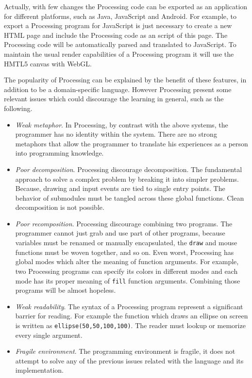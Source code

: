 Actually, with few changes the Processing code can be exported as an application for different platforms, such as Java, JavaScript and Android. For example, to export a Processing program for JavaScript is just necessary to create a new HTML page and include the Processing code as an script of this page. The Processing code will be automatically parsed and translated to JavaScript. To maintain the usual render capabilities of a Processing program it will use the HMTL5 canvas with WebGL.

The popularity of Processing can be explained by the benefit of these features, in addition to be a domain-specific language. However Processing present some relevant issues which could discourage the learning in general, such as the following.

\begin{itemize}
  \item \textit{Weak metaphor}. In Processing, by contrast with the above systems, the programmer has no identity within the system. There are no strong metaphors that allow the programmer to translate his experiences as a person into programming knowledge. 

  \item \textit{Poor decomposition}. Processing discourage decomposition. The fundamental approach to solve a complex problem by breaking it into simpler problems. Because, drawing and input events are tied to single entry points. The behavior of submodules must be tangled across these global functions. Clean decomposition is not possible.

  \item \textit{Poor recomposition}. Processing discourage combining two programs. The programmer cannot just grab and use part of other programs, because variables must be renamed or manually encapsulated, the \texttt{draw} and mouse functions must be woven together, and so on. Even worst, Processing has global modes which alter the meaning of function arguments. For example, two Processing programs can specify its colors in different modes and each mode has its proper meaning of \texttt{fill} function arguments. Combining those programs will be almost hopeless. 

  \item \textit{Weak readability}. The syntax of a Processing program represent a significant barrier for reading. For example the function which draws an ellipse on screen is written as \texttt{ellipse(50,50,100,100)}. The reader must lookup or memorize every single argument. 

  \item \textit{Fragile environment}. The programming environment is fragile, it does not attempt to solve any of the previous issues related with the language and its implementation. 
\end{itemize}

